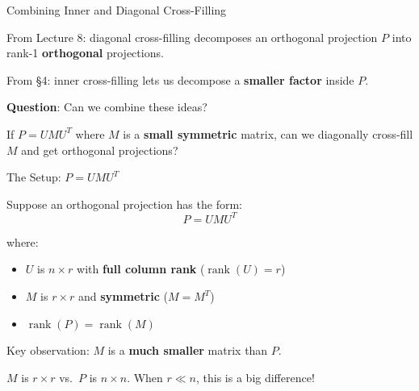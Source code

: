 \documentclass[10pt]{beamer}
\theoremstyle{definition}
\newcommand{\x}[1]{\alert{\textbf{#1}}}
\begin{document}
\begin{frame}{Combining Inner and Diagonal Cross-Filling}

From Lecture 8: diagonal cross-filling decomposes an orthogonal projection $P$ into rank-1 \x{orthogonal} projections.

\vspace{0.5em}

From \S4: inner cross-filling lets us decompose a \x{smaller factor} inside $P$.

\vspace{0.5em}

\x{Question}: Can we combine these ideas?

\vspace{0.5em}

If $P = UMU^T$ where $M$ is a \x{small symmetric} matrix, can we diagonally cross-fill $M$ and get orthogonal projections?

\end{frame}


\begin{frame}{The Setup: $P = UMU^T$}

Suppose an orthogonal projection has the form:
$$P = UMU^T$$

where:
\begin{itemize}
\item $U$ is $n \times r$ with \x{full column rank} ($\operatorname{rank}(U) = r$)
\item $M$ is $r \times r$ and \x{symmetric} ($M = M^T$)
\item $\operatorname{rank}(P) = \operatorname{rank}(M)$
\end{itemize}

\vspace{0.5em}

Key observation: $M$ is a \x{much smaller} matrix than $P$.

\vspace{0.3em}

$M$ is $r \times r$ vs.\ $P$ is $n \times n$. When $r \ll n$, this is a big difference!

\end{frame}
\end{document}
